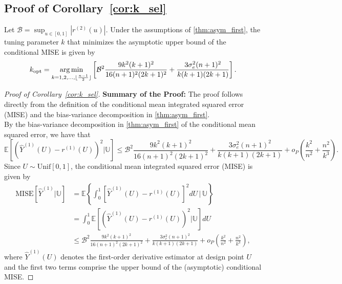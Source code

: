 \documentclass{uwstat572}
\theoremstyle{definition}
\DeclareMathOperator*{\argmin}{arg\,min}
\DeclarePairedDelimiter\floor{\lfloor}{\rfloor}
\renewcommand{\hat}{\widehat}
\theoremstyle{theorem}
\newenvironment{customcor}[1]
{\renewcommand\theinnercustomcor{#1}\innercustomcor}
{\endinnercustomcor}
\begin{document}
\subsection{Proof of Corollary~\ref{cor:k_sel}}
\label{App:proof_cor2}

\begin{customcor}{2}[Corollary 2 in \citealt{liu2020smoothed}]
Let $\mathcal{B} = \sup_{u\in [0,1]} \left|r^{(2)}(u)\right|$. Under the assumptions of \autoref{thm:asym_first}, the tuning parameter $k$ that minimizes the asymptotic upper bound of the conditional MISE is given by
$$k_{\text{opt}} = \argmin_{k=1,2,...,\floor{\frac{n-1}{2}}} \left[\mathcal{B}^2\frac{9k^2(k+1)^2}{16(n+1)^2(2k+1)^2} + \frac{3\sigma_e^2 (n+1)^2}{k(k+1)(2k+1)} \right].$$
\end{customcor}

\begin{proof}[Proof of Corollary~\ref{cor:k_sel}]
{\bf Summary of the Proof:} The proof follows directly from the definition of the conditional mean integrated squared error (MISE) and the bias-variance decomposition in \autoref{thm:asym_first}.\\

By the bias-variance decomposition in \autoref{thm:asym_first} of the conditional mean squared error, we have that
$$\mathbb{E}\left[\left(\hat{Y}^{(1)}(U) - r^{(1)}(U)\right)^2\big| \mathbb{U}\right] \leq \mathcal{B}^2 \frac{9k^2(k+1)^2}{16(n+1)^2(2k+1)^2} + \frac{3\sigma_e^2 (n+1)^2}{k(k+1)(2k+1)} + o_P\left(\frac{k^2}{n^2} + \frac{n^2}{k^3}\right).$$
Since $U\sim \mathrm{Unif}[0,1]$, the conditional mean integrated squared error (MISE) is given by
\begin{align*}
\mathrm{MISE}\left[\hat{Y}^{(1)}|\mathbb{U}\right] &= \mathbb{E}\left\{\int_0^1 \left[\hat{Y}^{(1)}(U) -r^{(1)}(U)\right]^2 dU \,\Big|\, \mathbb{U}\right\}\\
&= \int_0^1 \mathbb{E}\left[\left(\hat{Y}^{(1)}(U) -r^{(1)}(U)\right)^2 \Big| \mathbb{U} \right] dU\\
&\leq \mathcal{B}^2 \frac{9k^2(k+1)^2}{16(n+1)^2(2k+1)^2} + \frac{3\sigma_e^2 (n+1)^2}{k(k+1)(2k+1)} + o_P\left(\frac{k^2}{n^2} + \frac{n^2}{k^3}\right),
\end{align*}
where $\hat{Y}^{(1)}(U)$ denotes the first-order derivative estimator at design point $U$ and the first two terms comprise the upper bound of the (asymptotic) conditional MISE.
\end{proof}
\end{document}
